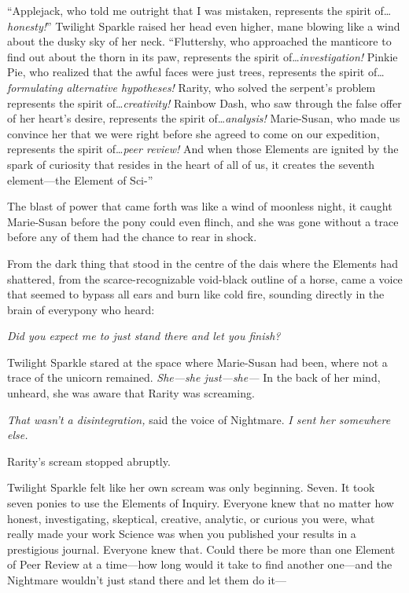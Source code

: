 
“Applejack, who told me outright that I was mistaken, represents the spirit of…\emph{honesty!}” Twilight Sparkle raised her head even higher, mane blowing like a wind about the dusky sky of her neck. “Fluttershy, who approached the manticore to find out about the thorn in its paw, represents the spirit of…\emph{investigation!} Pinkie Pie, who realized that the awful faces were just trees, represents the spirit of…\emph{formulating alternative hypotheses!} Rarity, who solved the serpent’s problem represents the spirit of…\emph{creativity!} Rainbow Dash, who saw through the false offer of her heart’s desire, represents the spirit of…\emph{analysis!} Marie-Susan, who made us convince her that we were right before she agreed to come on our expedition, represents the spirit of…\emph{peer review!} And when those Elements are ignited by the spark of curiosity that resides in the heart of all of us, it creates the seventh element—the Element of Sci-”

The blast of power that came forth was like a wind of moonless night, it caught Marie-Susan before the pony could even flinch, and she was gone without a trace before any of them had the chance to rear in shock.

From the dark thing that stood in the centre of the dais where the Elements had shattered, from the scarce-recognizable void-black outline of a horse, came a voice that seemed to bypass all ears and burn like cold fire, sounding directly in the brain of everypony who heard:

\emph{Did you expect me to just stand there and let you finish?}

Twilight Sparkle stared at the space where Marie-Susan had been, where not a trace of the unicorn remained. \emph{She—she just—she—} In the back of her mind, unheard, she was aware that Rarity was screaming.

\emph{That wasn’t a disintegration,} said the voice of Nightmare. \emph{I sent her somewhere else.}

Rarity’s scream stopped abruptly.

Twilight Sparkle felt like her own scream was only beginning. Seven. It took seven ponies to use the Elements of Inquiry. Everyone knew that no matter how honest, investigating, skeptical, creative, analytic, or curious you were, what really made your work Science was when you published your results in a prestigious journal. Everyone knew that. Could there be more than one Element of Peer Review at a time—how long would it take to find another one—and the Nightmare wouldn’t just stand there and let them do it—

